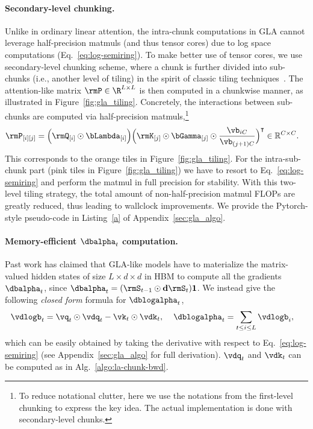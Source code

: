 \vspace{-2mm}

\paragraph{Secondary-level chunking.}
Unlike in ordinary linear attention, the intra-chunk computations in GLA {cannot} leverage half-precision matmuls (and thus tensor cores) due to log space computations (Eq.~\ref{eq:log-semiring}). To make better use of tensor cores, we use secondary-level chunking scheme, where a chunk is further divided into sub-chunks (i.e., another level of tiling) in the spirit of classic tiling techniques~\cite{flashattention1}. The  attention-like matrix $\rmP \in \R^{L\times L}$ is then computed in a chunkwise manner, as illustrated in Figure~\ref{fig:gla_tiling}. 
 Concretely, the interactions  between sub-chunks are computed via half-precision matmuls,\footnote{To reduce notational clutter, here we use the notations from the first-level chunking to express the key idea. The actual implementation is done with secondary-level chunks.}
\begin{align*}
 \rmP_{[i][j]} &=  \Big(\rmQ_{[i]} \odot \bLambda_{[i]} \Big) \Big(\rmK_{[j]} \odot \bGamma_{[j]} \odot  
 \frac{\vb_{iC}}{\vb_{(j+1)C}} \Big)^{\intercal} \in \mathbb{R}^{C\times C}.
 \label{eq:gla-subchunk-compute-p}
\end{align*}
This corresponds to the orange tiles in Figure~\ref{fig:gla_tiling}. For the intra-sub-chunk part (pink tiles in Figure~\ref{fig:gla_tiling}) we have to resort to Eq.~\ref{eq:log-semiring} and perform the matmul in full precision for stability.
With this two-level tiling strategy, the total amount of non-half-precision matmul FLOPs are greatly reduced, thus leading to wallclock improvements. We provide the Pytorch-style pseudo-code in Listing~\ref{a} of Appendix~\ref{sec:gla_algo}.

\vspace{-2mm}
\paragraph{Memory-efficient  \textnormal{$\dbalpha_t$} computation.} 
Past work \citep[\S 3.1]{mao-2022-fine} has claimed that GLA-like models have to materialize the matrix-valued hidden states of size $L \times d \times d$ in HBM to compute all the gradients $\dbalpha_t$, since $\dbalpha_t =  (\rmS_{t-1} \odot \mathbf d\rmS_{t}) \mathbf{1}$. 
We instead give the following \emph{closed form} formula for $\dblogalpha_t$, 
\begin{align*}
    \vdlogb_t &= \vq_t \odot \vdq_t - \vk_t \odot \vdk_t,  \hspace{4mm}
   \dblogalpha_t  = \sum_{t \leq i \leq L} \vdlogb_i,
\end{align*}
which can be easily obtained by taking the derivative with respect to 
 Eq.~\ref{eq:log-semiring} (see Appendix~\ref{sec:gla_algo} for full derivation). $\vdq_t$ and $\vdk_t$ can be  computed  as in Alg.~\ref{algo:la-chunk-bwd}.
 
